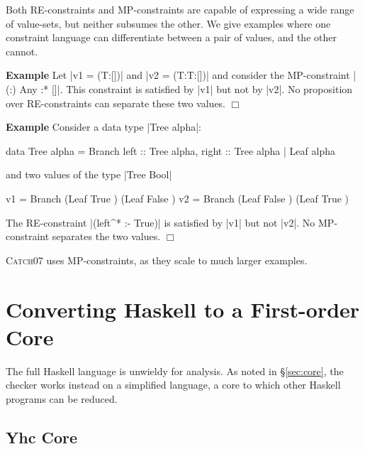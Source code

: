 \documentclass[preprint]{sigplanconf}
\let\cite=\citep
\newcommand{\catch}{\textsc{Catch}}
\newcounter{exmp}
\newcommand{\yesexample}{\addtocounter{exmp}{1}\addvspace{2mm}\noindent\textbf{Example \arabic{exmp}}}
\newcommand{\noexample}{\hfill$\Box$\par\addvspace{2mm}}
\newenvironment{discuss}
    {\noindent\hspace{-1.5mm}\vline\hspace{1mm}\vline\hspace{1mm}\begin{minipage}[h]{\linewidth}}
    {\end{minipage}}
\newenvironment{example}{\yesexample}{\noexample}
\begin{document}
Both RE-constraints and MP-constraints are capable of expressing a wide range of value-sets, but neither subsumes the other. We give examples where one constraint language can differentiate between a pair of values, and the other cannot.

\begin{example}
Let |v1 = (T:[])| and |v2 = (T:T:[])| and consider the MP-constraint |{(:) Any} :* {[]}|. This constraint is satisfied by |v1| but not by |v2|. No proposition over RE-constraints can separate these two values.
\end{example}

\begin{example}
Consider a data type |Tree alpha|:

\begin{code}
data Tree alpha  =  Branch {left :: Tree alpha, right :: Tree alpha}
                 |  Leaf alpha
\end{code}

\noindent and two values of the type |Tree Bool|

\begin{code}
v1 = Branch (Leaf True   ) (Leaf False  )
v2 = Branch (Leaf False  ) (Leaf True   )
\end{code}

\noindent The RE-constraint |(left^* :- True)| is satisfied by |v1| but not |v2|. No MP-constraint separates the two values.
\end{example}

\begin{discuss}
\catch07 uses MP-constraints, as they scale to much larger examples.
\end{discuss}

\section{Converting Haskell to a First-order Core}
\label{sec:transform}

The full Haskell language is unwieldy for analysis. As noted in \S\ref{sec:core}, the checker works instead on a simplified language, a core to which other Haskell programs can be reduced.

\subsection{Yhc Core}

\begin{comment}
-- a simple variant of lambda calculus without types, but with source position information. Yhc works by applying basic desugaring transformations, without optimisation. This simplicity ensures the generated PosLambda is close to the original Haskell in its structure. Each top-level function in a source file maps to a top-level function in the generated PosLambda, retaining the same name.

However, PosLambda has constructs that have no direct representation in Haskell. For example, there is a FatBar construct \cite{spj:implementation}, used for compiling pattern matches which require fall through behaviour. The PosLambda language
\end{comment}
\end{document}
